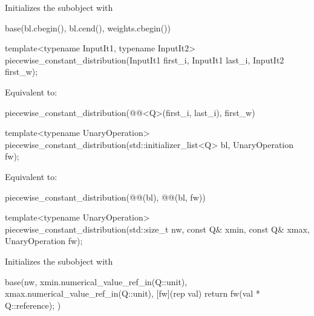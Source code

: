 \begin{itemdescr}
\pnum
\effects
Initializes the  subobject with
\begin{codeblock}
base(bl.cbegin(), bl.cend(), weights.cbegin())
\end{codeblock}
\end{itemdescr}

\begin{itemdecl}
template<typename InputIt1, typename InputIt2>
piecewise_constant_distribution(InputIt1 first_i, InputIt1 last_i, InputIt2 first_w);
\end{itemdecl}

\begin{itemdescr}
\pnum
\effects
Equivalent to:
\begin{codeblock}
piecewise_constant_distribution(@@<Q>(first_i, last_i), first_w)
\end{codeblock}
\end{itemdescr}

\begin{itemdecl}
template<typename UnaryOperation>
piecewise_constant_distribution(std::initializer_list<Q> bl, UnaryOperation fw);
\end{itemdecl}

\begin{itemdescr}
\pnum
\effects
Equivalent to:
\begin{codeblock}
piecewise_constant_distribution(@@(bl), @@(bl, fw))
\end{codeblock}
\end{itemdescr}

\begin{itemdecl}
template<typename UnaryOperation>
piecewise_constant_distribution(std::size_t nw, const Q& xmin, const Q& xmax, UnaryOperation fw);
\end{itemdecl}

\begin{itemdescr}
\pnum
\effects
Initializes the  subobject with
\begin{codeblock}
base(nw, xmin.numerical_value_ref_in(Q::unit), xmax.numerical_value_ref_in(Q::unit),
     [fw](rep val) { return fw(val * Q::reference); })
\end{codeblock}
\end{itemdescr}

